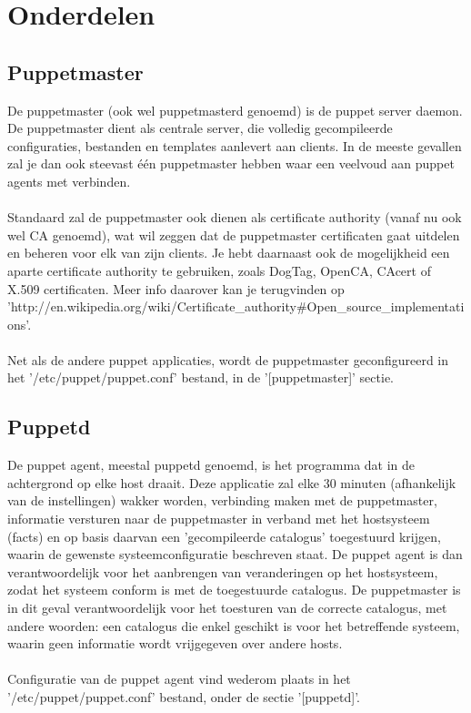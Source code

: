 \section{Onderdelen}

\subsection{Puppetmaster}
De puppetmaster (ook wel puppetmasterd genoemd) is de puppet server daemon. De puppetmaster dient als centrale server, die volledig gecompileerde configuraties, bestanden en templates aanlevert aan clients. In de meeste gevallen zal je dan ook steevast \'e\'en puppetmaster hebben waar een veelvoud aan puppet agents met verbinden.\\\\
Standaard zal de puppetmaster ook dienen als certificate authority (vanaf nu ook wel CA genoemd), wat wil zeggen dat de puppetmaster certificaten gaat uitdelen en beheren voor elk van zijn clients. Je hebt daarnaast ook de mogelijkheid een aparte certificate authority te gebruiken, zoals DogTag, OpenCA, CAcert of X.509 certificaten. Meer info daarover kan je terugvinden op 'http://en.wikipedia.org/wiki/Certificate\_authority\#Open\_source\_implementations'.\\\\
Net als de andere puppet applicaties, wordt de puppetmaster geconfigureerd in het '/etc/puppet/puppet.conf' bestand, in de '[puppetmaster]' sectie.

\subsection{Puppetd}
De puppet agent, meestal puppetd genoemd, is het programma dat in de achtergrond op elke host draait. Deze applicatie zal elke 30 minuten (afhankelijk van de instellingen) wakker worden, verbinding maken met de puppetmaster, informatie versturen naar de puppetmaster in verband met het hostsysteem (facts) en op basis daarvan een 'gecompileerde catalogus' toegestuurd krijgen, waarin de gewenste systeemconfiguratie beschreven staat. De puppet agent is dan verantwoordelijk voor het aanbrengen van veranderingen op het hostsysteem, zodat het systeem conform is met de toegestuurde catalogus. De puppetmaster is in dit geval verantwoordelijk voor het toesturen van de correcte catalogus, met andere woorden: een catalogus die enkel geschikt is voor het betreffende systeem, waarin geen informatie wordt vrijgegeven over andere hosts.\\\\
Configuratie van de puppet agent vind wederom plaats in het '/etc/puppet/puppet.conf' bestand, onder de sectie '[puppetd]'.


